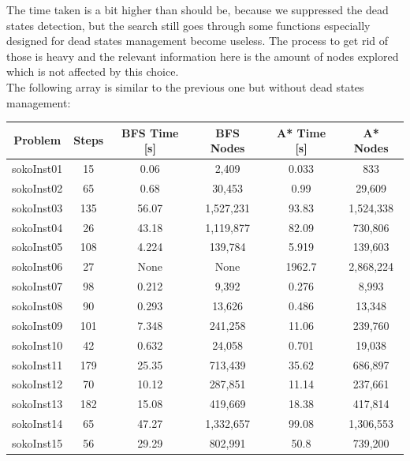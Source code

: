 \documentclass[a4paper,10pt]{article}
\begin{document}
			The time taken is a bit higher than should be, because we suppressed the dead states detection, but the search still goes through some functions especially designed for dead states management become useless. The process to get rid of those is heavy and the relevant information here is the amount of nodes explored which is not affected by this choice.\\
			The following array is similar to the previous one but without dead states management:\\
			
			\begin{tabular}{|c||c||c|c||c|c|}
				\hline 
				\textbf{Problem} & \textbf{Steps} & \textbf{BFS Time [s]} & \textbf{BFS Nodes} & \textbf{A* Time [s]} & \textbf{A* Nodes} \\ 
				\hline 
				sokoInst01 & 15 & 0.06 & 2,409 & 0.033 & 833 \\ 
				\hline
				sokoInst02 & 65 & 0.68 & 30,453 & 0.99 & 29,609 \\ 
				\hline
				sokoInst03 & 135 & 56.07 & 1,527,231 & 93.83 & 1,524,338 \\ 
				\hline
				sokoInst04 & 26 & 43.18 & 1,119,877 & 82.09 & 730,806 \\ 
				\hline
				sokoInst05 & 108 & 4.224 & 139,784 & 5.919 & 139,603 \\ 
				\hline
				sokoInst06 & 27 & None & None & 1962.7 & 2,868,224 \\ 
				\hline
				sokoInst07 & 98 & 0.212 & 9,392 & 0.276 & 8,993 \\ 
				\hline
				sokoInst08 & 90 & 0.293 & 13,626 & 0.486 & 13,348 \\ 
				\hline
				sokoInst09 & 101 & 7.348 & 241,258 & 11.06 & 239,760 \\ 
				\hline
				sokoInst10 & 42 & 0.632 & 24,058 & 0.701 & 19,038 \\ 
				\hline
				sokoInst11 & 179 & 25.35 & 713,439 & 35.62 & 686,897 \\ 
				\hline
				sokoInst12 & 70 & 10.12 & 287,851 & 11.14 & 237,661 \\ 
				\hline
				sokoInst13 & 182 & 15.08 & 419,669 & 18.38 & 417,814 \\ 
				\hline
				sokoInst14 & 65 & 47.27 & 1,332,657 & 99.08 & 1,306,553 \\ 
				\hline
				sokoInst15 & 56 & 29.29 & 802,991 & 50.8 & 739,200 \\ 
				\hline
			\end{tabular}\\
			
\end{document}
